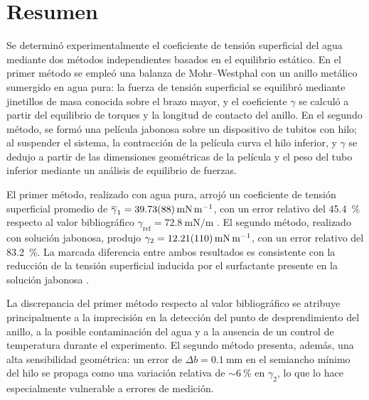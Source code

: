 
\section{Resumen}

Se determinó experimentalmente el coeficiente de tensión superficial
del agua mediante dos métodos independientes basados en el equilibrio
estático. En el primer método se empleó una balanza de Mohr--Westphal
con un anillo metálico sumergido en agua pura: la fuerza de tensión
superficial se equilibró mediante jinetillos de masa conocida sobre el
brazo mayor, y el coeficiente $\gamma$ se calculó a partir del equilibrio de torques
y la longitud de contacto del anillo. En el segundo método, se formó
una película jabonosa sobre un dispositivo de tubitos con hilo; al
suspender el sistema, la contracción de la película curva el hilo
inferior, y $\gamma$ se dedujo a partir de las dimensiones geométricas
de la película y el peso del tubo inferior mediante un análisis de
equilibrio de fuerzas.

El primer método, realizado con agua pura, arrojó un coeficiente de
tensión superficial promedio de
$\overline{\gamma}_1 = \qty{39.73 \pm 0.88}{\milli\newton\per\meter}$,
con un error relativo del \qty{45.4}{\percent} respecto al valor
bibliográfico $\gamma_{\text{ref}} = \qty{72.8}{\milli\newton\per\meter}$
\cite{serway}. El segundo método, realizado con solución jabonosa,
produjo $\gamma_2 = \qty{12.21 \pm 1.10}{\milli\newton\per\meter}$,
con un error relativo del \qty{83.2}{\percent}. La marcada diferencia
entre ambos resultados es consistente con la reducción de la tensión
superficial inducida por el surfactante presente en la solución
jabonosa \cite{halliday}.

La discrepancia del primer método respecto al valor bibliográfico se
atribuye principalmente a la imprecisión en la detección del punto de
desprendimiento del anillo, a la posible contaminación del agua y a la
ausencia de un control de temperatura durante el experimento. El segundo
método presenta, además, una alta sensibilidad geométrica: un error de
$\Delta b = \qty{0.1}{\milli\meter}$ en el semiancho mínimo del hilo
se propaga como una variación relativa de $\sim\qty{6}{\percent}$ en
$\gamma_2$, lo que lo hace especialmente vulnerable a errores de
medición.